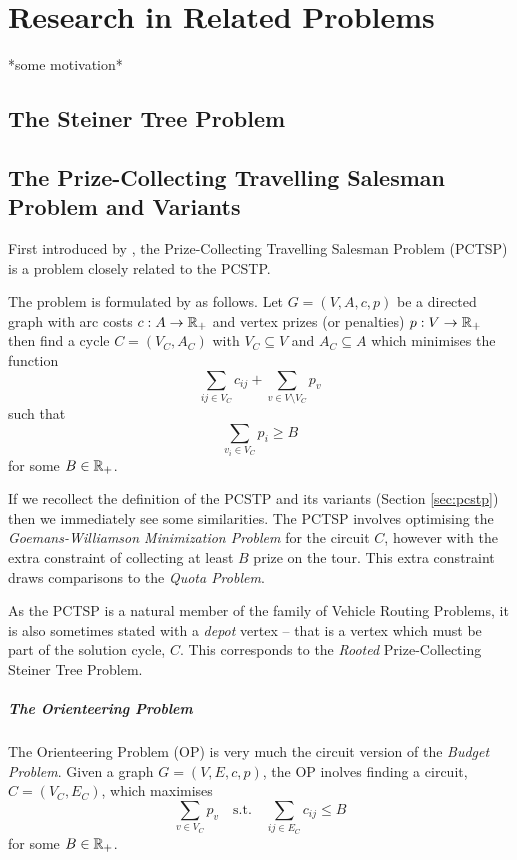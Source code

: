 \chapter{Research in Related Problems}
\label{chap:related}
*some motivation*

\section{The Steiner Tree Problem}
\section{The Prize-Collecting Travelling Salesman Problem and Variants}
First introduced by \citet*{balas1989prize}, the Prize-Collecting Travelling Salesman Problem
(PCTSP) is a problem closely related to the
PCSTP.

The problem is formulated by \citeauthor{balas1989prize} as follows. Let
$G = (V, A, c, p)$ be a directed
graph with arc costs $c: A \to \mathbb{R}_+$ and vertex prizes (or penalties) $p: V \to \mathbb{R}_+$
then find a cycle $C = (V_C, A_C)$ with $V_C \subseteq V$ and $A_C \subseteq A$ which
minimises the function
$$\sum_{ij \in V_C} c_{ij} + \sum_{v \in V \setminus V_C} p_v$$
such that
$$\sum_{v_i \in V_C} p_i \geq B$$
for some $B \in \mathbb{R}_+$.

If we recollect the definition of the PCSTP and its variants (Section \ref{sec:pcstp}) then
we immediately see some similarities. The PCTSP involves optimising the
\textit{Goemans-Williamson Minimization Problem} for the circuit $C$, however with the extra
constraint of collecting at least $B$ prize on the tour. This extra constraint draws comparisons
to the \textit{Quota Problem}.

As the PCTSP is a natural member of the family of Vehicle Routing Problems, it is also sometimes
stated with a \textit{depot} vertex \citep{feillet2005traveling} -- that is a vertex which
must be part of the solution cycle, $C$. This corresponds to the \textit{Rooted}
Prize-Collecting Steiner Tree Problem.

\paragraph{The Orienteering Problem}
The Orienteering Problem (OP) is very much the circuit version of the \textit{Budget Problem}.
Given a graph $G  = (V, E, c, p)$, the OP inolves finding a circuit, $C = (V_C, E_C)$,
which maximises
$$\sum_{v \in V_C}  p_v \quad \text{s.t.} \quad \sum_{ij \in E_C} c_{ij} \leq B$$
for some $B \in \mathbb{R}_+$.

